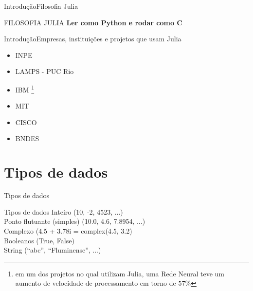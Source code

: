 \documentclass{beamer}
\begin{document}
\begin{frame}{Introdução}{Filosofia Julia}
    \begin{block}{\centering FILOSOFIA JULIA}
        \centering
        \textbf{Ler como Python e rodar como C}
    \end{block}
\end{frame}

\begin{frame}{Introdução}{Empresas, instituições e projetos que usam Julia}
    \begin{itemize}
        \item INPE
        \item LAMPS - PUC Rio
        \item IBM \footnote{em um dos projetos no qual utilizam Julia, uma Rede Neural teve um aumento de velocidade de processamento em torno de $57\%$}
        \item MIT 
        \item CISCO
        \item BNDES
    \end{itemize}
\end{frame}

\section{Tipos de dados}
\begin{frame}{Tipos de dados}
    \begin{block}{Tipos de dados}
        Inteiro (10, -2, 4523, ...)\\
        Ponto flutuante (simples) (10.0, 4.6, 7.8954, ...)\\
        Complexo (4.5 + 3.78i = complex(4.5, 3.2)\\
        Booleanos (True, False)\\
        String (``abc'', ``Fluminense'', ...) 
    \end{block}
\end{frame}
\end{document}
